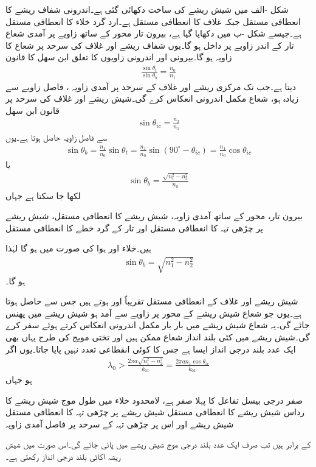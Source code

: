 شکل -الف میں شیش ریشے کی ساخت دکھائی گئی ہے۔اندرونی شفاف ریشے کا  انعطافی مستقل  جبکہ غلاف کا  انعطافی مستقل  ہے۔ارد گرد خلاء کا  انعطافی مستقل  ہے۔جیسے شکل -ب میں دکھایا گیا ہے، بیرون تار محور کے ساتھ  زاویے پر آمدی شعاع تار کے اندر  زاویے پر داخل ہو گا۔یوں شفاف ریشے اور غلاف کی سرحد پر شعاع کا زاویہ  ہو گا۔بیرونی اور اندرونی زاویوں کا تعلق ابن سھل کا قانون
\begin{align}
\frac{\sin \theta_t}{\sin \theta_b}=\frac{n_0}{n_1}
\end{align}
دیتا ہے۔جب تک مرکزی ریشے اور غلاف کے سرحد پر آمدی زاویہ ، فاصل زاویے  سے زیادہ ہو، شعاع مکمل اندرونی انعکاس کرے گی۔شیش ریشے اور غلاف کی سرحد پر قانون ابن سھل
\begin{align}
\sin{\theta_{ic}}=\frac{n_2}{n_1}
\end{align}
 سے فاصل زاویہ  حاصل ہوتا ہے۔یوں
\begin{align*}
\sin \theta_b=\frac{n_1}{n_0} \sin \theta_t =\frac{n_1}{n_0} \sin(90^{\circ}-\theta_{ic})=\frac{n_1}{n_0} \cos \theta_{ic}
\end{align*}
یا
\begin{align}
\sin \theta_b=\frac{\sqrt{n_1^2-n_2^2}}{n_0}
\end{align}
لکھا جا سکتا ہے جہاں
\begin{description}
 بیرون تار، محور کے ساتھ آمدی زاویہ،
 شیش ریشے کا  انعطافی مستقل،
 شیش ریشے پر چڑھی تہہ کا  انعطافی مستقل اور
 تار کے گرد خطے کا  انعطافی مستقل
\end{description}
ہیں۔خلاء اور ہوا کی صورت میں  ہو گا لہٰذا
\begin{align}
\sin \theta_b=\sqrt{n_1^2-n_2^2}
\end{align}
ہو گا۔

شیش ریشے اور غلاف کے  انعطافی مستقل تقریباً  اور  ہوتے ہیں جس سے  حاصل ہوتا ہے۔یوں جو شعاع شیش ریشے کے محور پر  زاویے سے آمد ہو شیش ریشے میں پھنس جائے گی۔یہ شعاع شیش ریشے میں بار بار مکمل اندرونی انعکاس کرتے ہوئے سفر کرے گی۔شیش ریشے میں کئی بلند انداز شعاع ممکن ہیں اور تختی مویج کی طرح یہاں بھی ایک عدد بلند درجی انداز ایسا ہے جس کا کوئی انقطاعی تعدد نہیں پایا جاتا۔یوں اگر
\begin{align}
\lambda_0>\frac{2\pi a \sqrt{n_1^2-n_2^2}}{k_{01}}=\frac{2\pi a n_1 \cos \theta_{ic}}{k_{01}}
\end{align}
ہو جہاں
\begin{description}
 صفر درجی بیسل تفاعل  کا پہلا صفر  ہے،
 لامحدود خلاء میں طول موج
 شیش ریشے کا رداس
 شیش ریشے کا  انعطافی مستقل
 شیش ریشے پر چڑھی تہہ کا  انعطافی مستقل
 شیش ریشے اور اس پر چڑھی تہہ کے سرحد پر فاصل آمدی زاویہ
\end{description}
کے برابر ہیں تب صرف ایک عدد بلند درجی موج شیش ریشے میں پائی جائے گی۔اس صورت میں شیش ریشہ اکائی بلند درجی انداز رکھتی ہے۔

